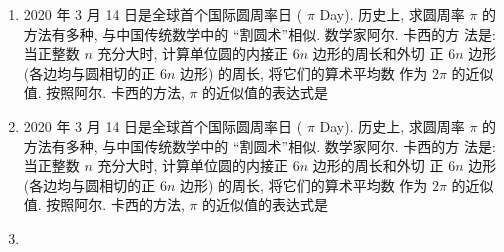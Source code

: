 \documentclass{ctexart}
\begin{document}
  \begin{enumerate}
    \item 
      2020 年 3 月 14 日是全球首个国际圆周率日 ( $\pi$ Day). 历史上, 求圆周率 $\pi$ 的方法有多种, 与中国传统数学中的 “割圆术”相似. 数学家阿尔. 卡西的方 法是: 当正整数 $n$ 充分大时, 计算单位圆的内接正 $6 n$ 边形的周长和外切 正 $6 n$ 边形 (各边均与圆相切的正 $6 n$ 边形) 的周长, 将它们的算术平均数 作为 $2 \pi$ 的近似值. 按照阿尔. 卡西的方法, $\pi$ 的近似值的表达式是 \xparen
    \item
      2020 年 3 月 14 日是全球首个国际圆周率日 ( $\pi$ Day). 历史上, 求圆周率 $\pi$ 的方法有多种, 与中国传统数学中的 “割圆术”相似. 数学家阿尔. 卡西的方 法是: 当正整数 $n$ 充分大时, 计算单位圆的内接正 $6 n$ 边形的周长和外切 正 $6 n$ 边形 (各边均与圆相切的正 $6 n$ 边形) 的周长, 将它们的算术平均数 作为 $2 \pi$ 的近似值. 按照阿尔. 卡西的方法, $\pi$ 的近似值的表达式是 \xparen
    \item  %
  \end{enumerate}
  
 
\end{document}
